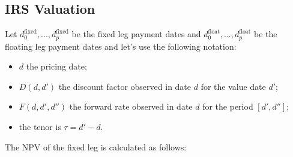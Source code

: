 %
%
%
%    
%       

\subsection{IRS Valuation}
\label{irs-valuation}
Let $d_0^{\mathrm{fixed}},...,d_p^{\mathrm{fixed}}$ be the fixed leg payment dates and $d_0^{\mathrm{float}},...,d_p^{\mathrm{float}}$ be the floating leg payment dates and let's use the following notation:

\begin{itemize}
\tightlist
\item $d$ the pricing date;
\item $D(d, d')$ the discount factor observed in date $d$ for the value date $d'$;
\item $F(d, d', d'')$ the forward rate observed in date $d$ for the period $[d', d'']$;
\item the tenor is $\tau = d' - d$.
\end{itemize}
The NPV of the fixed leg is calculated as follows:

